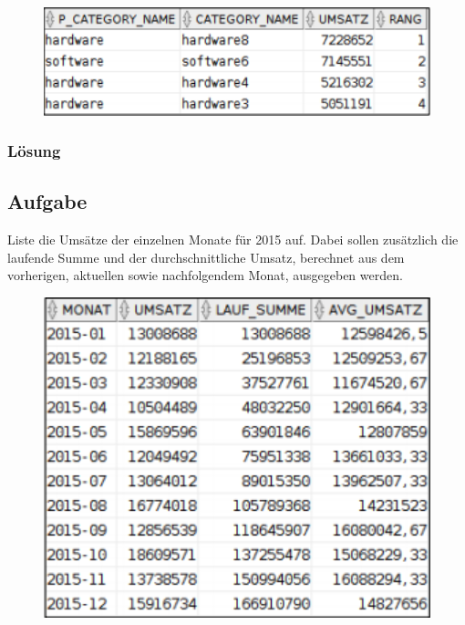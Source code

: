 \begin{figure}[H]
  \centering
  \includegraphics[width=1\textwidth]{img//uebung_07_-_aufgabe_03.png}
  \label{img:uebung_07_-_aufgabe_03}
\end{figure}

\subsubsection*{Lösung}
\label{subsubsec:uebung_07.aufgabe_03.loesung}


\label{subsec:uebung_07.aufgabe_04}
\subsection{Aufgabe}
Liste die Umsätze der einzelnen Monate für 2015 auf. Dabei sollen zusätzlich die laufende Summe und der durchschnittliche Umsatz, berechnet aus dem vorherigen, aktuellen sowie nachfolgendem Monat, ausgegeben werden.

\begin{figure}[H]
  \centering
  \includegraphics[width=1\textwidth]{img//uebung_07_-_aufgabe_04.png}
  \label{img:uebung_07_-_aufgabe_04}
\end{figure}

